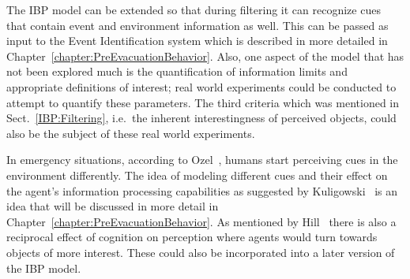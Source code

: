 The IBP model can be extended so that during filtering it can recognize cues that contain event and environment information as well. This can be passed as input to the Event Identification system which is described in more detailed in Chapter~\ref{chapter:PreEvacuationBehavior}. Also, one aspect of the model that has not been explored much is the quantification of information limits and appropriate definitions of interest; real world experiments could be conducted to attempt to quantify these parameters. The third criteria which was mentioned in Sect.~\ref{IBP:Filtering}, i.e.\ the inherent interestingness of perceived objects, could also be the subject of these real world experiments.

In emergency situations, according to Ozel~\cite{Ozel:2001tn}, humans start perceiving cues in the environment differently. The idea of modeling different cues and their effect on the agent's information processing capabilities as suggested by Kuligowski~\cite{Kuligowski:2009un} is an idea that will be discussed in more detail in Chapter~\ref{chapter:PreEvacuationBehavior}. As mentioned by Hill~\cite{Hill:1999ww} there is also a reciprocal effect of cognition on perception where agents would turn towards objects of more interest. These could also be incorporated into a later version of the IBP model.

